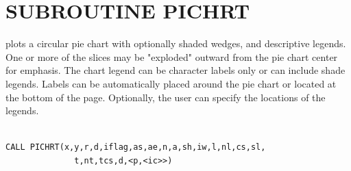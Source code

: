 \documentclass[11pt]{report}
\begin{document}
\newpage
\section{SUBROUTINE PICHRT}

 plots a circular pie chart with optionally shaded wedges, and
descriptive legends.  One or more of the slices may be "exploded" outward
from the pie chart center for emphasis.  The chart legend can be character
labels only or can include shade legends.  Labels can be automatically placed
around the pie chart or located at the bottom of the page.  Optionally, the
user can specify the locations of the legends.
\begin{verbatim}

CALL PICHRT(x,y,r,d,iflag,as,ae,n,a,sh,iw,l,nl,cs,sl,
              t,nt,tcs,d,<p,<ic>>)


\end{verbatim}
\end{document}
